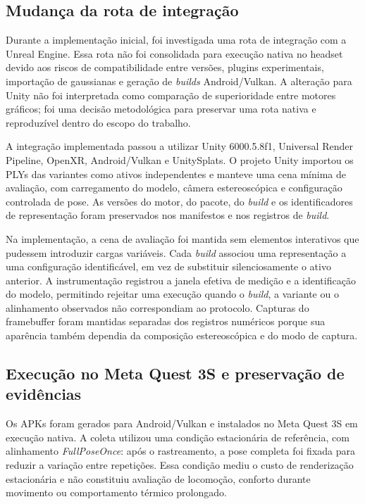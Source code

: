 \subsection{Mudança da rota de integração}

Durante a implementação inicial, foi investigada uma rota de integração com a Unreal Engine. Essa rota não foi consolidada para execução nativa no headset devido aos riscos de compatibilidade entre versões, plugins experimentais, importação de gaussianas e geração de \textit{builds} Android/Vulkan. A alteração para Unity não foi interpretada como comparação de superioridade entre motores gráficos; foi uma decisão metodológica para preservar uma rota nativa e reproduzível dentro do escopo do trabalho.

A integração implementada passou a utilizar Unity 6000.5.8f1, Universal Render Pipeline, OpenXR, Android/Vulkan e UnitySplats. O projeto Unity importou os PLYs das variantes como ativos independentes e manteve uma cena mínima de avaliação, com carregamento do modelo, câmera estereoscópica e configuração controlada de pose. As versões do motor, do pacote, do \textit{build} e os identificadores de representação foram preservados nos manifestos e nos registros de \textit{build}.

Na implementação, a cena de avaliação foi mantida sem elementos interativos que pudessem introduzir cargas variáveis. Cada \textit{build} associou uma representação a uma configuração identificável, em vez de substituir silenciosamente o ativo anterior. A instrumentação registrou a janela efetiva de medição e a identificação do modelo, permitindo rejeitar uma execução quando o \textit{build}, a variante ou o alinhamento observados não correspondiam ao protocolo. Capturas do framebuffer foram mantidas separadas dos registros numéricos porque sua aparência também dependia da composição estereoscópica e do modo de captura.

\subsection{Execução no Meta Quest 3S e preservação de evidências}

Os APKs foram gerados para Android/Vulkan e instalados no Meta Quest 3S em execução nativa. A coleta utilizou uma condição estacionária de referência, com alinhamento \textit{FullPoseOnce}: após o rastreamento, a pose completa foi fixada para reduzir a variação entre repetições. Essa condição mediu o custo de renderização estacionária e não constituiu avaliação de locomoção, conforto durante movimento ou comportamento térmico prolongado.

